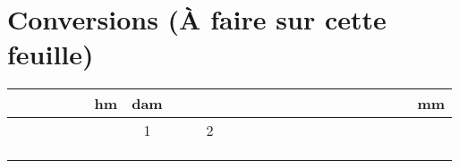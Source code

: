 \section{Conversions (\`A faire sur cette feuille) }


\begin{center}
	\begin{tabular}{|@{\ \ \ }c@{\ \ \ }|@{\ \ \ }c@{\ \ \ }|@{\ \ \ }c@{\ \ \ }|@{\ \ \ }c@{\ \ \ }|@{\ \ \ }c@{\ \ \ }|@{\ \ \ }c@{\ \ \ }|@{\ \ \ }c@{\ \ \ }|}
		\hline
		\ \ \ \ \ \ \ \  & \textbf{hm} & \textbf{dam} & \ \ \ \ \ \ \ \    & \ \ \ \ \ \ \ \   & \ \ \ \ \ \ \ \  & \textbf{mm} \\ \hline
		&             & 1            & 2 &  &  &             \\ \hline
		&             &              &   &  &  &             \\ \hline
		&             &              &   &  &  &             \\ \hline
		&             &              &   &  &  &             \\ \hline
	\end{tabular}
\end{center}

